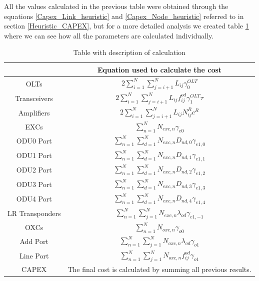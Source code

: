 \vspace{17pt}
All the values calculated in the previous table were obtained through the equations \ref{Capex_Link_heuristic} and \ref{Capex_Node_heuristic} referred to in section \ref{Heuristic_CAPEX}, but for a more detailed analysis we created table \ref{formulas_transp_heuristic} where we can see how all the parameters are calculated individually. \\

\begin{table}[h!]
\centering
\begin{tabular}{|| c | c ||}
 \hline
  & Equation used to calculate the cost \\ \hline
 OLTs & \(\displaystyle 2 \sum_{i=1}^{N}\sum_{j=i+1}^{N} L_{ij} \gamma_0^{OLT} \) \\ \hline
 Transceivers & \(\displaystyle 2 \sum_{i=1}^{N}\sum_{j=i+1}^{N} L_{ij} f_{ij}^{od} \gamma_1^{OLT} \tau \) \\ \hline
 Amplifiers & \(\displaystyle 2 \sum_{i=1}^{N}\sum_{j=i+1}^{N} L_{ij} N^R_{ij} c^R \) \\ \hline
 EXCs & \(\displaystyle \sum_{n=1}^N N_{exc,n} \gamma_{e0} \) \\ \hline
 ODU0 Port & \(\displaystyle \sum_{n=1}^{N} \sum_{d=1}^{N} N_{exc,n} D_{nd,0} \gamma_{e1,0} \) \\ \hline
 ODU1 Port & \(\displaystyle \sum_{n=1}^{N} \sum_{d=1}^{N} N_{exc,n} D_{nd,1} \gamma_{e1,1} \) \\ \hline
 ODU2 Port & \(\displaystyle \sum_{n=1}^{N} \sum_{d=1}^{N} N_{exc,n} D_{nd,2} \gamma_{e1,2} \)\\ \hline
 ODU3 Port & \(\displaystyle \sum_{n=1}^{N} \sum_{d=1}^{N} N_{exc,n} D_{nd,3} \gamma_{e1,3} \) \\ \hline
 ODU4 Port & \(\displaystyle \sum_{n=1}^{N} \sum_{d=1}^{N} N_{exc,n} D_{nd,4} \gamma_{e1,4} \) \\ \hline
 LR Transponders & \(\displaystyle \sum_{n=1}^{N} \sum_{j=1}^{N} N_{exc,n} \lambda_{od} \gamma_{e1,-1} \) \\ \hline
 OXCs & \(\displaystyle \sum_{n=1}^N N_{oxc,n} \gamma_{o0} \) \\ \hline
 Add Port & \(\displaystyle \sum_{n=1}^{N} \sum_{j=1}^{N} N_{oxc,n} \lambda_{od} \gamma_{o1} \) \\ \hline
 Line Port & \(\displaystyle \sum_{n=1}^{N} \sum_{j=1}^{N} N_{oxc,n} f_{ij}^{od} \gamma_{o1} \) \\ \hline
 CAPEX & The final cost is calculated by summing all previous results. \\
 \hline
 \end{tabular}
\caption{Table with description of calculation}
\label{formulas_transp_heuristic}
\end{table}

